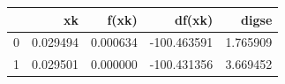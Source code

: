 \begin{tabular}{lrrrr}
\toprule
 & xk & f(xk) & df(xk) & digse \\
\midrule
0 & 0.029494 & 0.000634 & -100.463591 & 1.765909 \\
1 & 0.029501 & 0.000000 & -100.431356 & 3.669452 \\
\bottomrule
\end{tabular}
